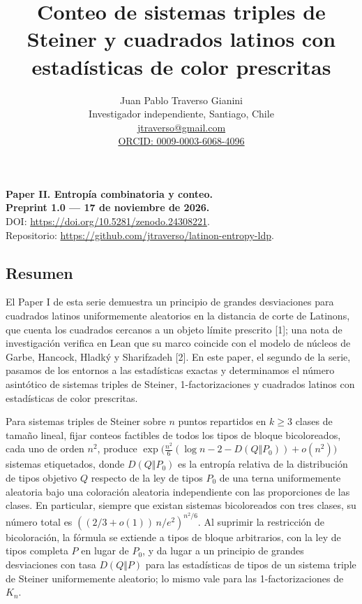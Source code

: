 \documentclass[spanish,11pt,a4paper]{article}
\title{Conteo de sistemas triples de Steiner y cuadrados latinos con estadísticas de color prescritas}
\author{Juan Pablo Traverso Gianini\\\small Investigador independiente, Santiago, Chile\\\small \href{mailto:jtraverso@gmail.com}{jtraverso@gmail.com}\\\small \href{https://orcid.org/0009-0003-6068-4096}{ORCID: 0009-0003-6068-4096}}
\date{}
\begin{document}
\raggedbottom\maketitle
\begin{center}
\textbf{Paper II. Entropía combinatoria y conteo.}\\
\textbf{Preprint 1.0 --- 17 de noviembre de 2026.}\\
DOI: \url{https://doi.org/10.5281/zenodo.24308221}.\\
Repositorio: \url{https://github.com/jtraverso/latinon-entropy-ldp}.
\end{center}

\subsection{Resumen}\label{resumen}

El Paper I de esta serie demuestra un principio de grandes desviaciones para cuadrados latinos uniformemente aleatorios en la distancia de corte de Latinons, que cuenta los cuadrados cercanos a un objeto límite prescrito {[}1{]}; una nota de investigación verifica en Lean que su marco coincide con el modelo de núcleos de Garbe, Hancock, Hladký y Sharifzadeh {[}2{]}. En este paper, el segundo de la serie, pasamos de los entornos a las estadísticas exactas y determinamos el número asintótico de sistemas triples de Steiner, 1-factorizaciones y cuadrados latinos con estadísticas de color prescritas.

Para sistemas triples de Steiner sobre \(n\) puntos repartidos en \(k\ge3\) clases de tamaño lineal, fijar conteos factibles de todos los tipos de bloque bicoloreados, cada uno de orden \(n^2\), produce \(\exp\bigl(\frac{n^2}{6}(\log n-2-D(Q\Vert P_0))+o(n^2)\bigr)\) sistemas etiquetados, donde \(D(Q\Vert P_0)\) es la entropía relativa de la distribución de tipos objetivo \(Q\) respecto de la ley de tipos \(P_0\) de una terna uniformemente aleatoria bajo una coloración aleatoria independiente con las proporciones de las clases. En particular, siempre que existan sistemas bicoloreados con tres clases, su número total es \(((2/3+o(1))\,n/e^2)^{n^2/6}\). Al suprimir la restricción de bicoloración, la fórmula se extiende a tipos de bloque arbitrarios, con la ley de tipos completa \(P\) en lugar de \(P_0\), y da lugar a un principio de grandes desviaciones con tasa \(D(Q\Vert P)\) para las estadísticas de tipos de un sistema triple de Steiner uniformemente aleatorio; lo mismo vale para las 1-factorizaciones de \(K_n\).
\end{document}
